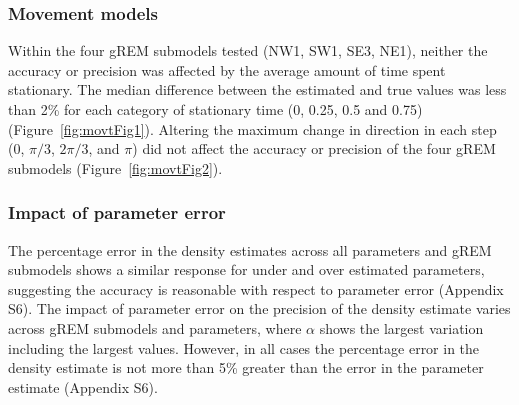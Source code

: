 \subsubsection{Movement models}

Within the four gREM submodels tested (NW1, SW1, SE3, NE1), neither the accuracy or precision was affected by the average amount of time spent stationary.
The median difference between the estimated and true values was less than 2\% for each category of stationary time (0, 0.25, 0.5 and 0.75) (Figure~\ref{fig:movtFig1}).
Altering the maximum change in direction in each step (0, $\pi/3$, $2\pi/3$, and $\pi$) did not affect the accuracy or precision of the four gREM submodels (Figure~\ref{fig:movtFig2}). 

\subsubsection{Impact of parameter error}

The percentage error in the density estimates across all parameters and gREM submodels shows a similar response for under and over estimated parameters, suggesting the accuracy is reasonable with respect to parameter error (Appendix S6).
The impact of parameter error on the precision of the density estimate varies across gREM submodels and parameters, where $\alpha$ shows the largest variation including the largest values.
However, in all cases the percentage error in the density estimate is not more than 5\% greater than the error in the parameter estimate (Appendix S6).



